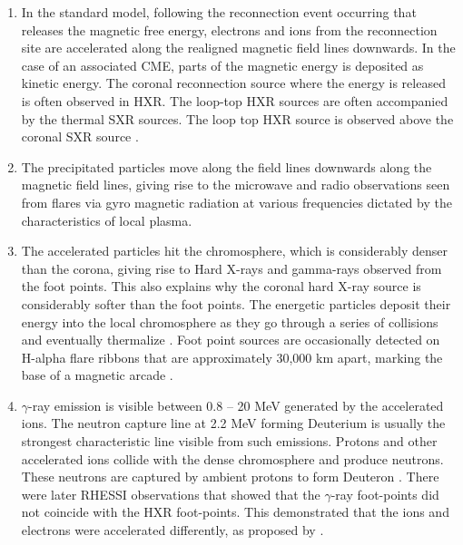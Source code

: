 \begin{enumerate}
    \item In the standard model, following the reconnection event occurring that releases the magnetic free energy, electrons and ions from the reconnection site are accelerated along the realigned magnetic field lines downwards. In the case of an associated CME, parts of the magnetic energy is deposited as kinetic energy. The coronal reconnection source where the energy is released is often observed in HXR. The loop-top HXR sources are often accompanied by the thermal SXR sources. The loop top HXR source is observed above the coronal SXR source \citep{masuda94}.
    
    \item The precipitated particles move along the field lines downwards along the magnetic field lines, giving rise to the microwave and radio observations seen from flares via gyro magnetic radiation at various frequencies dictated by the characteristics of local plasma.
    
    \item The accelerated particles hit the chromosphere, which is considerably denser than the corona, giving rise to Hard X-rays and gamma-rays observed from the foot points. This also explains why the coronal hard X-ray source is considerably softer than the foot points. The energetic particles deposit their energy into the local chromosphere as they go through a series of collisions and eventually thermalize \citep{brown83}. Foot point sources are occasionally detected on H-alpha flare ribbons that are approximately 30,000 km apart, marking the base of a magnetic arcade \citep{masuda01}.

    \item $\gamma$-ray emission is visible between 0.8 {--} 20 MeV generated by the accelerated ions. The neutron capture line at 2.2 MeV forming Deuterium is usually the strongest characteristic line visible from such emissions. Protons and other accelerated ions collide with the dense chromosphere and produce neutrons. These neutrons are captured by ambient protons to form Deuteron \citep{ramtay74,hua87}. There were later RHESSI observations \citep{hurford_2003,hurford_2006} that showed that the $\gamma$-ray foot-points did not coincide with the HXR foot-points. This demonstrated that the ions and electrons were accelerated differently, as proposed by \cite{emslie_2004}.


\end{enumerate}
